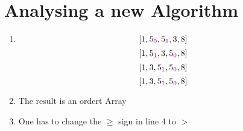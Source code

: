 \documentclass[sectionformat = exercise]{gadsescript}
\begin{document}
\section{Analysing a new Algorithm}
\begin{enumerate}[label=\alph*)]
	\item 
		\[ [ 1, 5_{\color{violet} 0}, 5_{\color{violet} 1}, 3, 8 ] \]
		\[ [ 1, 5_{\color{violet} 1}, 3, 5_{\color{violet} 0}, 8 ] \]
		\[ [ 1, 3, 5_{\color{violet} 1}, 5_{\color{violet} 0}, 8 ] \]
		\[ [ 1, 3, 5_{\color{violet} 1}, 5_{\color{violet} 0}, 8 ] \]
	\item The result is an ordert Array
	\item One has to change the $\geq$ sign in line 4 to $ > $
\end{enumerate}
\end{document}
